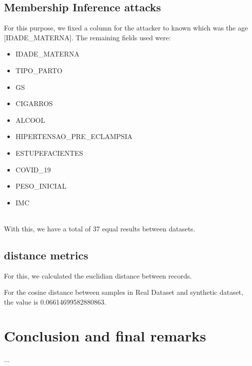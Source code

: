\documentclass{article}
\begin{document}
\subsection{Membership Inference attacks}
For this purpose, we fixed a column for the attacker to known which was the age [IDADE\_MATERNA].
The remaining fields used were:
\begin{itemize}
 
  \item IDADE\_MATERNA
     
  \item TIPO\_PARTO
     
  \item GS
     
  \item CIGARROS
     
  \item ALCOOL
     
  \item HIPERTENSAO\_PRE\_ECLAMPSIA
     
  \item ESTUPEFACIENTES
     
  \item COVID\_19
     
  \item PESO\_INICIAL
     
  \item IMC
     
  \end{itemize}
\\
With this, we have a total of 37 equal results between datasets.

\subsection{distance metrics}

For this, we calculated the euclidian distance between records.

For the cosine distance between samples in Real Dataset and synthetic dataset, the value is 0.06614699582880863.



\section{Conclusion and final remarks}

...

\cleardoublepage
\printglossary[type=\acronymtype]
\cleardoublepage


\end{document}
